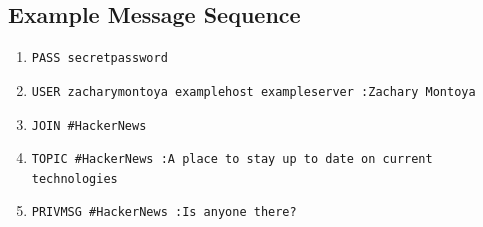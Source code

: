 \documentclass{article}
\begin{document}
\subsection{Example Message Sequence}
\begin{enumerate}
    \item \texttt{PASS secretpassword}
    \item \texttt{USER zacharymontoya examplehost exampleserver :Zachary Montoya}
    \item \texttt{JOIN \#HackerNews}
    \item \texttt{TOPIC \#HackerNews :A place to stay up to date on current technologies}
    \item \texttt{PRIVMSG \#HackerNews :Is anyone there?}
\end{enumerate}
\end{document}
